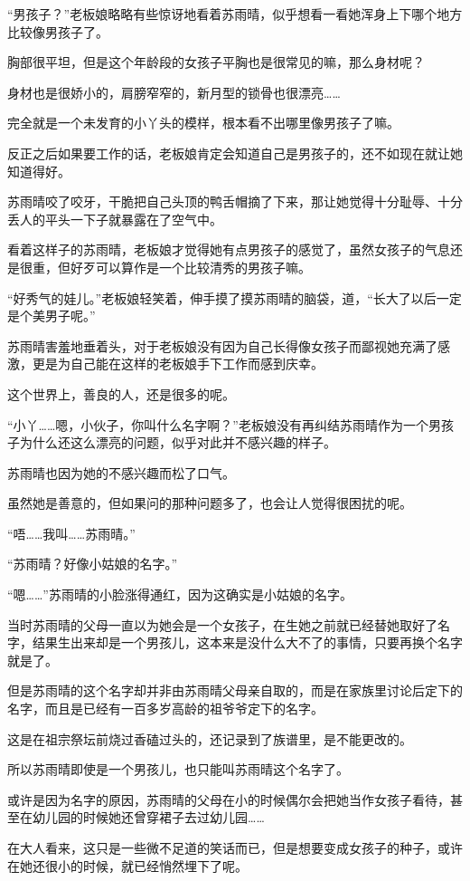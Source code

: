 “男孩子？”老板娘略略有些惊讶地看着苏雨晴，似乎想看一看她浑身上下哪个地方比较像男孩子了。

胸部很平坦，但是这个年龄段的女孩子平胸也是很常见的嘛，那么身材呢？

身材也是很娇小的，肩膀窄窄的，新月型的锁骨也很漂亮……

完全就是一个未发育的小丫头的模样，根本看不出哪里像男孩子了嘛。

反正之后如果要工作的话，老板娘肯定会知道自己是男孩子的，还不如现在就让她知道得好。

苏雨晴咬了咬牙，干脆把自己头顶的鸭舌帽摘了下来，那让她觉得十分耻辱、十分丢人的平头一下子就暴露在了空气中。

看着这样子的苏雨晴，老板娘才觉得她有点男孩子的感觉了，虽然女孩子的气息还是很重，但好歹可以算作是一个比较清秀的男孩子嘛。

“好秀气的娃儿。”老板娘轻笑着，伸手摸了摸苏雨晴的脑袋，道，“长大了以后一定是个美男子呢。”

苏雨晴害羞地垂着头，对于老板娘没有因为自己长得像女孩子而鄙视她充满了感激，更是为自己能在这样的老板娘手下工作而感到庆幸。

这个世界上，善良的人，还是很多的呢。

“小丫……嗯，小伙子，你叫什么名字啊？”老板娘没有再纠结苏雨晴作为一个男孩子为什么还这么漂亮的问题，似乎对此并不感兴趣的样子。

苏雨晴也因为她的不感兴趣而松了口气。

虽然她是善意的，但如果问的那种问题多了，也会让人觉得很困扰的呢。

“唔……我叫……苏雨晴。”

“苏雨晴？好像小姑娘的名字。”

“嗯……”苏雨晴的小脸涨得通红，因为这确实是小姑娘的名字。

当时苏雨晴的父母一直以为她会是一个女孩子，在生她之前就已经替她取好了名字，结果生出来却是一个男孩儿，这本来是没什么大不了的事情，只要再换个名字就是了。

但是苏雨晴的这个名字却并非由苏雨晴父母亲自取的，而是在家族里讨论后定下的名字，而且是已经有一百多岁高龄的祖爷爷定下的名字。

这是在祖宗祭坛前烧过香磕过头的，还记录到了族谱里，是不能更改的。

所以苏雨晴即使是一个男孩儿，也只能叫苏雨晴这个名字了。

或许是因为名字的原因，苏雨晴的父母在小的时候偶尔会把她当作女孩子看待，甚至在幼儿园的时候她还曾穿裙子去过幼儿园……

在大人看来，这只是一些微不足道的笑话而已，但是想要变成女孩子的种子，或许在她还很小的时候，就已经悄然埋下了呢。

